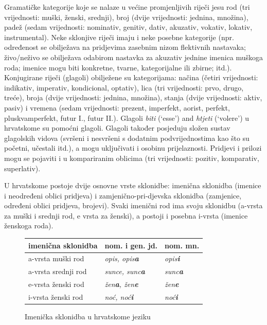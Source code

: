 \begin{multicols}{2}
Gramatičke kategorije koje se nalaze u većine promjenljivih riječi jesu rod (tri vrijednosti: muški, ženski, srednji), broj (dvije vrijednosti: jednina, množina), padež (sedam vrijednosti: nominativ, genitiv, dativ, akuzativ, vokativ, lokativ, instrumental). Neke sklonjive riječi imaju i neke posebne kategorije (npr. određenost se obilježava na pridjevima zasebnim nizom flektivnih nastavaka; živo/neživo se obilježava odabirom nastavka za akuzativ jednine imenica muškoga roda; imenice mogu biti konkretne, tvarne, kategorijalne ili zbirne; itd.). Konjugirane riječi (glagoli) obilježene su kategorijama: načina (četiri vrijednosti: indikativ, imperativ, kondicional, optativ), lica (tri vrijednosti: prvo, drugo, treće), broja (dvije vrijednosti: jednina, množina), stanja (dvije vrijednosti: aktiv, pasiv) i vremena (sedam vrijednosti: prezent, imperfekt, aorist, perfekt, pluskvamperfekt, futur I., futur II.). Glagoli \emph{biti} (‘esse’) and \emph{htjeti} (‘volere’) u hrvatskome su pomoćni glagoli. Glagoli također posjeduju složen sustav glagolskih vidova (svršeni i nesvršeni s dodatnim podvrijednostima kao što su početni, učestali itd.), a mogu uključivati i osobinu prijelaznosti. Pridjevi i prilozi mogu se pojaviti i u kompariranim oblicima (tri vrijednosti: pozitiv, komparativ, superlativ).

U hrvatskome postoje dvije osnovne vrste sklonidbe: imenična sklonidba (imenice i neodređeni oblici pridjeva) i zamjenično-pri-djevska sklonidba (zamjenice, određeni oblici pridjeva, brojevi). Svaki imenični rod ima svoju sklonidbu (a-vrsta za muški i srednji rod, e vrsta za ženski), a postoji i posebna i-vrsta (imenice ženskoga roda).

\begin{figure}[htb]
\centering
	\begin{tabular}{ |l|l|l| }
  \hline
  \textbf{imenična sklonidba} & \textbf{nom. i gen. jd.} & \textbf{nom. mn.}  \\ 
  \hline \hline
  a-vrsta muški rod   & \emph{opis, opis\textbf{a}}     &  \emph{opis\textbf{i}} \\ 
  \hline
  a-vrsta srednji rod   & \emph{sunce, sunc\textbf{a}}     &  \emph{sunc\textbf{a}} \\ 
  \hline
  e-vrsta ženski rod   & \emph{žen\textbf{a}, žen\textbf{e}}     &  \emph{žen\textbf{e}} \\
  \hline
  i-vrsta ženski rod   & \emph{noć, noć\textbf{i}}     &  \emph{noć\textbf{i}} \\
  \hline
  \end{tabular}
  \caption{Imenička sklonidba u hrvatskome jeziku}
  \label{fig:imenicka}
\end{figure}


\end{multicols}
